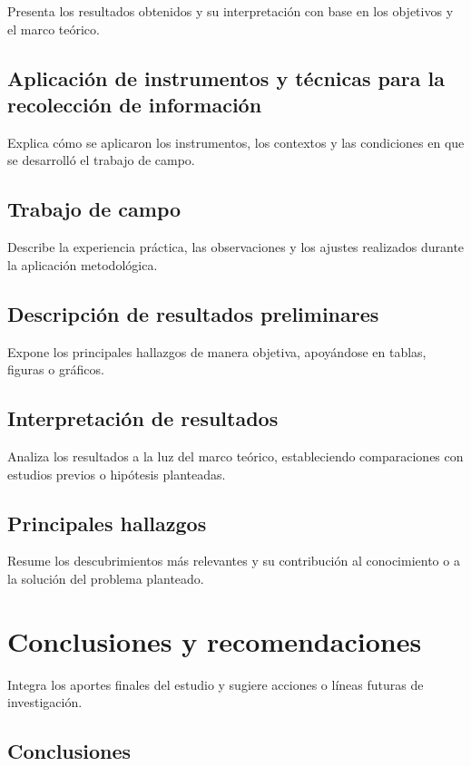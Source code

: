 Presenta los resultados obtenidos y su interpretación con base en los objetivos y el marco teórico.

\subsection{Aplicación de instrumentos y técnicas para la recolección de información}

Explica cómo se aplicaron los instrumentos, los contextos y las condiciones en que se desarrolló el trabajo de campo.

\subsection{Trabajo de campo}

Describe la experiencia práctica, las observaciones y los ajustes realizados durante la aplicación metodológica.

\subsection{Descripción de resultados preliminares}

Expone los principales hallazgos de manera objetiva, apoyándose en tablas, figuras o gráficos.

\subsection{Interpretación de resultados}

Analiza los resultados a la luz del marco teórico, estableciendo comparaciones con estudios previos o hipótesis planteadas.

\subsection{Principales hallazgos}

Resume los descubrimientos más relevantes y su contribución al conocimiento o a la solución del problema planteado.

\clearpage\section{Conclusiones y recomendaciones}

Integra los aportes finales del estudio y sugiere acciones o líneas futuras de investigación.

\subsection{Conclusiones}


